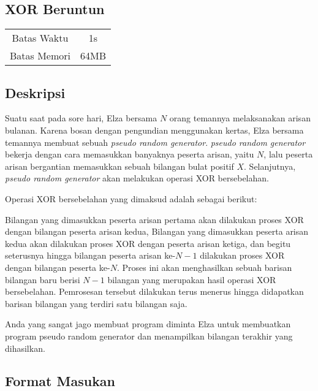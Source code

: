 \documentclass{article}
\begin{document}
\begin{center}
    \section*{XOR Beruntun} %

    \begin{tabular}{ | c c | }
        \hline
        Batas Waktu  & 1s \\    %
        Batas Memori & 64MB \\  %
        \hline
    \end{tabular}
\end{center}

\subsection*{Deskripsi}

Suatu saat pada sore hari, Elza bersama $N$ orang temannya melaksanakan arisan bulanan.
Karena bosan dengan pengundian menggunakan kertas, Elza bersama temannya membuat sebuah \textit{pseudo random generator}.
\textit{pseudo random generator} bekerja dengan cara memasukkan banyaknya peserta arisan, yaitu $N$, lalu peserta arisan bergantian memasukkan sebuah bilangan bulat positif $X$.
Selanjutnya, \textit{pseudo random generator} akan melakukan operasi XOR bersebelahan.

Operasi XOR bersebelahan yang dimaksud adalah sebagai berikut:

Bilangan yang dimasukkan peserta arisan pertama akan dilakukan proses XOR dengan bilangan peserta arisan kedua, 
Bilangan yang dimasukkan peserta arisan kedua akan dilakukan proses XOR dengan peserta arisan ketiga, 
dan begitu seterusnya hingga bilangan peserta arisan ke-$N - 1$ dilakukan proses XOR dengan bilangan peserta ke-$N$. Proses ini akan menghasilkan sebuah barisan bilangan baru berisi $N - 1$ bilangan yang merupakan hasil operasi XOR bersebelahan. 
Pemrosesan tersebut dilakukan terus menerus hingga didapatkan barisan bilangan yang terdiri satu bilangan saja.

Anda yang sangat jago membuat program diminta Elza untuk membuatkan program pseudo random generator dan menampilkan bilangan terakhir yang dihasilkan.

\subsection*{Format Masukan}
\end{document}
